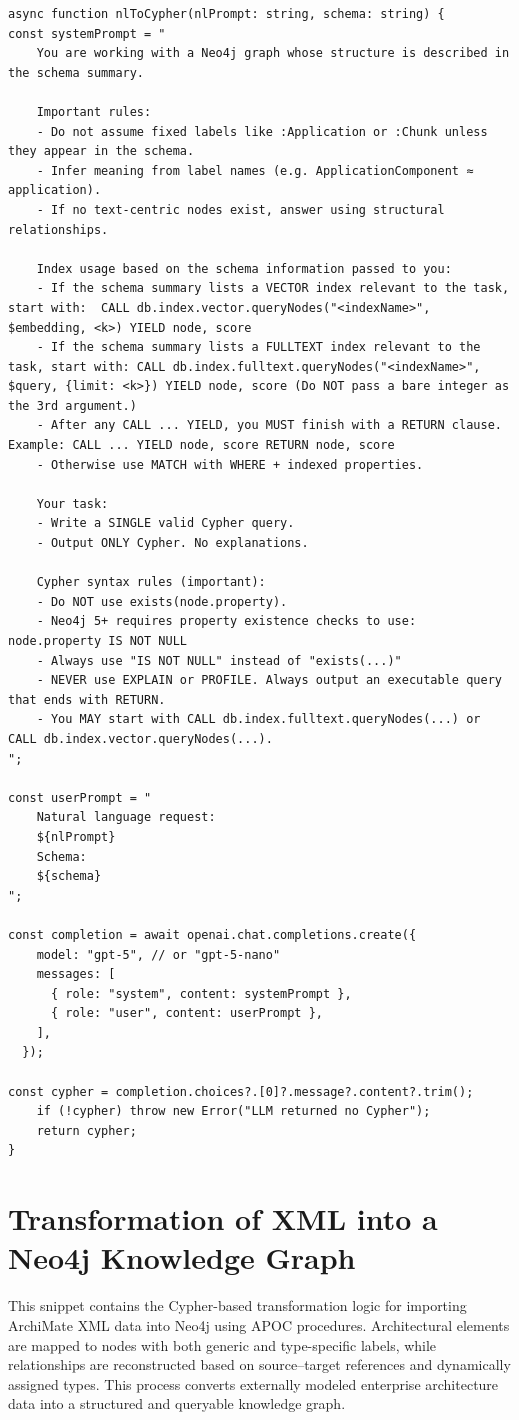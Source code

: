 \begin{lstlisting}[style=javascriptstyle, label={lst:system_prompt_1}]
async function nlToCypher(nlPrompt: string, schema: string) {
const systemPrompt = "
	You are working with a Neo4j graph whose structure is described in the schema summary.

	Important rules:
	- Do not assume fixed labels like :Application or :Chunk unless they appear in the schema.
	- Infer meaning from label names (e.g. ApplicationComponent ≈ application).
	- If no text-centric nodes exist, answer using structural relationships.

	Index usage based on the schema information passed to you:
	- If the schema summary lists a VECTOR index relevant to the task, start with:  CALL db.index.vector.queryNodes("<indexName>", $embedding, <k>) YIELD node, score
	- If the schema summary lists a FULLTEXT index relevant to the task, start with: CALL db.index.fulltext.queryNodes("<indexName>", $query, {limit: <k>}) YIELD node, score (Do NOT pass a bare integer as the 3rd argument.)
	- After any CALL ... YIELD, you MUST finish with a RETURN clause. Example: CALL ... YIELD node, score RETURN node, score
	- Otherwise use MATCH with WHERE + indexed properties.

	Your task:
	- Write a SINGLE valid Cypher query.
	- Output ONLY Cypher. No explanations.

	Cypher syntax rules (important):
	- Do NOT use exists(node.property).
	- Neo4j 5+ requires property existence checks to use: node.property IS NOT NULL
	- Always use "IS NOT NULL" instead of "exists(...)"
	- NEVER use EXPLAIN or PROFILE. Always output an executable query that ends with RETURN.
	- You MAY start with CALL db.index.fulltext.queryNodes(...) or CALL db.index.vector.queryNodes(...).
";

const userPrompt = "
	Natural language request:
	${nlPrompt}
	Schema:
	${schema}
";

const completion = await openai.chat.completions.create({
    model: "gpt-5", // or "gpt-5-nano"
    messages: [
      { role: "system", content: systemPrompt },
      { role: "user", content: userPrompt },
    ],
  });

const cypher = completion.choices?.[0]?.message?.content?.trim();
	if (!cypher) throw new Error("LLM returned no Cypher");
	return cypher;
}
\end{lstlisting}


\section{Transformation of XML into a Neo4j Knowledge Graph}
\label{appendix:code:xmltranspiler}
This snippet contains the Cypher-based transformation logic for importing ArchiMate XML data into Neo4j using APOC procedures. Architectural elements are mapped to nodes with both generic and type-specific labels, while relationships are reconstructed based on source–target references and dynamically assigned types. This process converts externally modeled enterprise architecture data into a structured and queryable knowledge graph.

